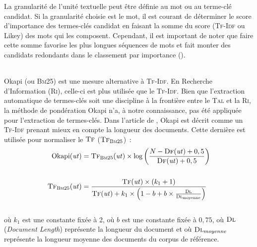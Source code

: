         La granularité de l'unité textuelle peut être définie au mot ou au
        terme-clé candidat. Si la granularité choisie est le mot, il est courant
        de déterminer le score d'importance des termes-clés candidat en faisant
        la somme du score (\textsc{Tf-Idf} ou Likey) des mots qui les composent.
        Cependant, il est important de noter que faire cette somme favorise les
        plus longues séquences de mots et fait monter des candidats redondants
        dans le classement par importance ().

        ~\\Okapi (ou \textsc{Bm}25) \cite{robertson1999okapi} est une mesure
        alternative à \textsc{Tf-Idf}. En Recherche d'Information (\textsc{Ri}),
        celle-ci est plus utilisée que le \textsc{Tf-Idf}. Bien que l'extraction
        automatique de termes-clés soit une discipline à la frontière entre le
        \textsc{Tal} et la \textsc{Ri}, la méthode de pondération Okapi n'a, à
        notre connaissance, pas été appliquée pour l'extraction de termes-clés.
        Dans l'article de , Okapi est décrit
        comme un \textsc{Tf-Idf} prenant mieux en compte la longueur des
        documents. Cette dernière est utilisée pour normaliser le $\textsc{Tf}$
        ($\textsc{Tf}_{\textsc{Bm}25}$)~:
        \begin{align}
          \text{Okapi}(\text{\textit{ut}}) &= \textsc{Tf}_{\textsc{Bm}25}(\text{\textit{ut}}) \times \log\left(\frac{N - \textsc{Df}(\text{\textit{ut}}) + 0,5}{\textsc{Df}(\text{\textit{ut}}) + 0,5}\right) \label{math:okapi}\\
          \notag\\
          \textsc{Tf}_{\textsc{Bm}25}(\text{\textit{ut}}) &= \frac{\textsc{Tf}(\text{\textit{ut}}) \times (k_1 + 1)}{\textsc{Tf}(\text{\textit{ut}}) + k_1 \times \left(1 - b + b \times \frac{\textsc{Dl}}{\textsc{Dl}_{\text{moyenne}}}\right)} \label{math:tf_bm25}
        \end{align}\\
        où $k_1$ est une constante fixée à 2, où $b$ est une constante fixée à
        $0,75$, où $\textsc{Dl}$ (\textit{Document Length}) représente la
        longueur du document et où $\textsc{Dl}_{moyenne}$ représente la
        longueur moyenne des documents du corpus de référence.

